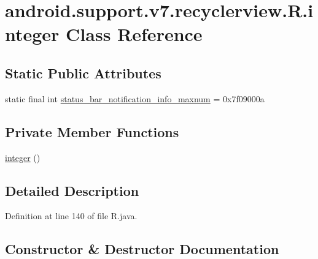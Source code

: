\hypertarget{classandroid_1_1support_1_1v7_1_1recyclerview_1_1_r_1_1integer}{}\section{android.\+support.\+v7.\+recyclerview.\+R.\+integer Class Reference}
\label{classandroid_1_1support_1_1v7_1_1recyclerview_1_1_r_1_1integer}
\subsection*{Static Public Attributes}
\begin{DoxyCompactItemize}
\item 
static final int \mbox{\hyperlink{classandroid_1_1support_1_1v7_1_1recyclerview_1_1_r_1_1integer_ad9015376b52984f0f7509667c0934f11}{status\+\_\+bar\+\_\+notification\+\_\+info\+\_\+maxnum}} = 0x7f09000a
\end{DoxyCompactItemize}
\subsection*{Private Member Functions}
\begin{DoxyCompactItemize}
\item 
\mbox{\hyperlink{classandroid_1_1support_1_1v7_1_1recyclerview_1_1_r_1_1integer_a10dc1cbb3b04a7ae7c6c459e6675e12d}{integer}} ()
\end{DoxyCompactItemize}


\subsection{Detailed Description}


Definition at line 140 of file R.\+java.



\subsection{Constructor \& Destructor Documentation}
\mbox{\label{classandroid_1_1support_1_1v7_1_1recyclerview_1_1_r_1_1integer_a10dc1cbb3b04a7ae7c6c459e6675e12d}} 
